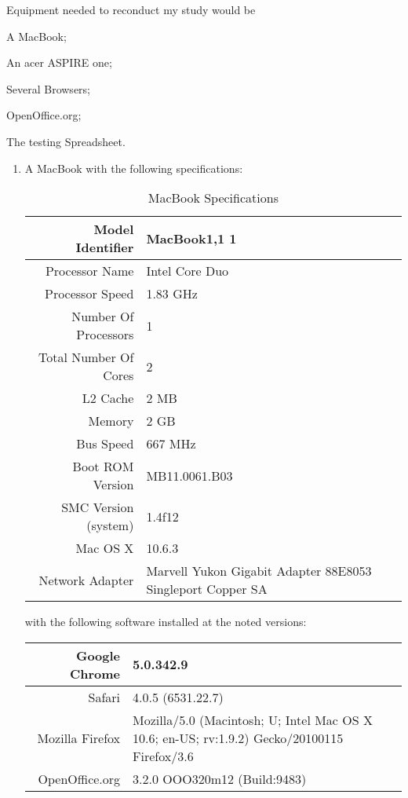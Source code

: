 \documentclass[12pt,oneside,letterpaper,titlepage]{article}
\begin{document}
Equipment needed to reconduct my study would be
\begin{inparaenum}[(1)]
\item A MacBook;
\item An acer ASPIRE one;
\item Several Browsers;
\item OpenOffice.org;
\item The testing Spreadsheet.
\end{inparaenum}

\begin{enumerate}

\item A MacBook with the following specifications:

  \begin{table}[htbp]
    \caption{MacBook Specifications}
    \begin{tabular}{| r | p{5cm} |}
      \hline
      Model Identifier      & MacBook1,1 1 \\ \hline
      Processor Name        & Intel Core Duo \\ \hline
      Processor Speed       & 1.83 GHz \\ \hline
      Number Of Processors  & 1 \\ \hline
      Total Number Of Cores & 2 \\ \hline
      L2 Cache              & 2 MB \\ \hline
      Memory                & 2 GB \\ \hline
      Bus Speed             & 667 MHz \\ \hline
      Boot ROM Version      & MB11.0061.B03 \\ \hline
      SMC Version (system)  & 1.4f12 \\ \hline
      Mac OS X              & 10.6.3 \\ \hline
      Network  Adapter      & Marvell Yukon Gigabit Adapter 88E8053 Singleport
      Copper SA \\
      \hline
    \end{tabular}
  \end{table}

  with the following software installed at the noted versions:

  \begin{tabular}{| r | p{5cm} |}
    \hline
    Google Chrome   & 5.0.342.9 \\ \hline
    Safari          & 4.0.5 (6531.22.7) \\ \hline
    Mozilla Firefox & Mozilla/5.0 (Macintosh; U; Intel Mac OS X 10.6; en-US;
    rv:1.9.2) Gecko/20100115 Firefox/3.6 \\ \hline
    OpenOffice.org  & 3.2.0 OOO320m12 (Build:9483) \\
    \hline
  \end{tabular}


\end{enumerate}
\end{document}

